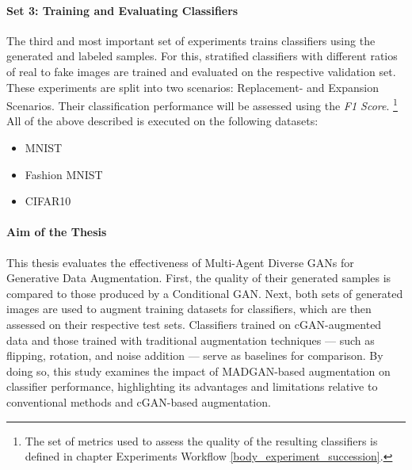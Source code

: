 \paragraph{Set 3: Training and Evaluating Classifiers}  \label{thesis_goal_3}
The third and most important set of experiments trains classifiers using the generated and labeled samples. For this, stratified classifiers with different ratios of real to fake images are trained and evaluated on the respective validation set. These experiments are split into two scenarios: Replacement- and Expansion Scenarios. Their classification performance will be assessed using the \textit{F1 Score}. \footnote{The set of metrics used to assess the quality of the resulting classifiers is defined in chapter Experiments Workflow \ref{body_experiment_succession}.}
\\

\noindent All of the above described is executed on the following datasets:
\begin{itemize}\label{used_datasets}
    \setlength{\itemsep}{-5pt}
    \item MNIST \cite{lecun2010mnist}
    \item Fashion MNIST \cite{xiao2017fashionmnist}
    \item CIFAR10 \cite{Krizhevsky2009learning}
\end{itemize}


\paragraph{Aim of the Thesis}\label{aim_of_the_thesis}
This thesis evaluates the effectiveness of Multi-Agent Diverse GANs for Generative Data Augmentation. First, the quality of their generated samples is compared to those produced by a Conditional GAN. Next, both sets of generated images are used to augment training datasets for classifiers, which are then assessed on their respective test sets. Classifiers trained on cGAN-augmented data and those trained with traditional augmentation techniques — such as flipping, rotation, and noise addition — serve as baselines for comparison.
By doing so, this study examines the impact of MADGAN-based augmentation on classifier performance, highlighting its advantages and limitations relative to conventional methods and cGAN-based augmentation.



\newpage
